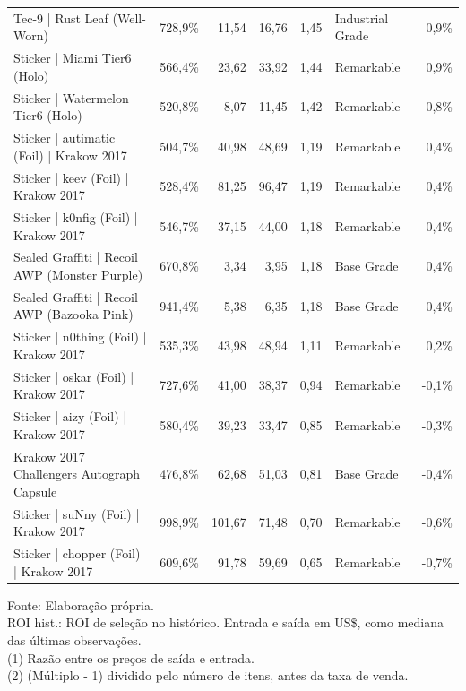 \begin{longtable}{@{\extracolsep{\fill}}lrrrrlr}
Tec-9 | Rust Leaf (Well-Worn) & 728,9\% & 11,54 & 16,76 & 1,45 & Industrial Grade & 0,9\% \\
Sticker | Miami Tier6 (Holo) & 566,4\% & 23,62 & 33,92 & 1,44 & Remarkable & 0,9\% \\
Sticker | Watermelon Tier6 (Holo) & 520,8\% & 8,07 & 11,45 & 1,42 & Remarkable & 0,8\% \\
Sticker | autimatic (Foil) | Krakow 2017 & 504,7\% & 40,98 & 48,69 & 1,19 & Remarkable & 0,4\% \\
Sticker | keev (Foil) | Krakow 2017 & 528,4\% & 81,25 & 96,47 & 1,19 & Remarkable & 0,4\% \\
Sticker | k0nfig (Foil) | Krakow 2017 & 546,7\% & 37,15 & 44,00 & 1,18 & Remarkable & 0,4\% \\
Sealed Graffiti | Recoil AWP (Monster Purple) & 670,8\% & 3,34 & 3,95 & 1,18 & Base Grade & 0,4\% \\
Sealed Graffiti | Recoil AWP (Bazooka Pink) & 941,4\% & 5,38 & 6,35 & 1,18 & Base Grade & 0,4\% \\
Sticker | n0thing (Foil) | Krakow 2017 & 535,3\% & 43,98 & 48,94 & 1,11 & Remarkable & 0,2\% \\
Sticker | oskar (Foil) | Krakow 2017 & 727,6\% & 41,00 & 38,37 & 0,94 & Remarkable & -0,1\% \\
Sticker | aizy (Foil) | Krakow 2017 & 580,4\% & 39,23 & 33,47 & 0,85 & Remarkable & -0,3\% \\
Krakow 2017 Challengers Autograph Capsule & 476,8\% & 62,68 & 51,03 & 0,81 & Base Grade & -0,4\% \\
Sticker | suNny (Foil) | Krakow 2017 & 998,9\% & 101,67 & 71,48 & 0,70 & Remarkable & -0,6\% \\
Sticker | chopper (Foil) | Krakow 2017 & 609,6\% & 91,78 & 59,69 & 0,65 & Remarkable & -0,7\% \\
\bottomrule
\end{longtable}
\begin{minipage}{\linewidth}
Fonte: Elaboração própria.\\
ROI hist.: ROI de seleção no histórico. Entrada e saída em US\$, como mediana das últimas observações.\\
(1) Razão entre os preços de saída e entrada.\\
(2) (Múltiplo - 1) dividido pelo número de itens, antes da taxa de venda.\\
\end{minipage}
\endgroup
